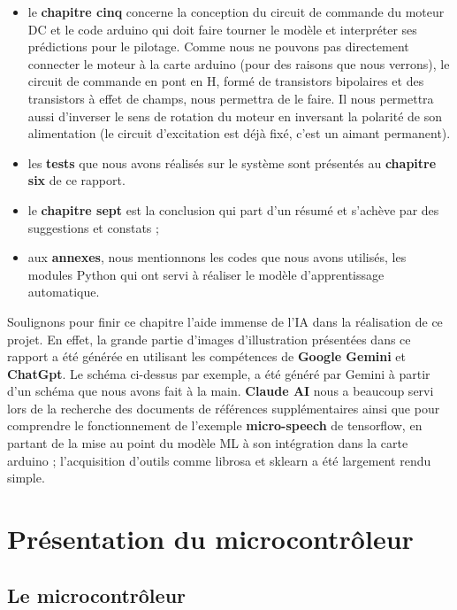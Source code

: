 \documentclass[a4paper,12pt,twoside]{report}
\theoremstyle{definition}
\theoremstyle{plain}
\theoremstyle{remark}
\begin{document}
\begin{itemize}
	\item le \textbf{chapitre cinq} concerne la conception du circuit de commande du moteur \ac{DC} et le code arduino qui doit faire tourner le modèle et interpréter ses prédictions pour le pilotage. Comme nous ne pouvons pas directement connecter le moteur à la carte arduino (pour des raisons que nous verrons), le circuit de commande en pont en H, formé de transistors bipolaires et des transistors à effet de champs, nous permettra de le faire. Il nous permettra aussi d'inverser le sens de rotation du moteur en inversant la polarité de son alimentation (le circuit d'excitation est déjà fixé, c'est un aimant permanent).
	
	\item les \textbf{tests} que nous avons réalisés sur le système sont présentés au \textbf{chapitre six} de ce rapport.
	
	\item le \textbf{chapitre sept} est la conclusion qui part d'un résumé et s'achève par des suggestions et constats ;
	\item aux \textbf{annexes}, nous mentionnons les codes que nous avons utilisés, les modules Python qui ont servi à réaliser le modèle d'apprentissage automatique.
\end{itemize}

Soulignons pour finir ce chapitre l'aide immense de l'\ac{IA} dans la réalisation de ce projet. En effet, la grande partie d'images d'illustration présentées dans ce rapport a été générée en utilisant les compétences de \textbf{Google Gemini} et \textbf{ChatGpt}. Le schéma ci-dessus par exemple, a été généré par Gemini à partir d'un schéma que nous avons fait à la main. \textbf{Claude AI} nous a beaucoup servi lors de la recherche des documents de références supplémentaires ainsi que pour comprendre le fonctionnement de l'exemple \textbf{micro-speech} de tensorflow, en partant de la mise au point du modèle \ac{ML} à son intégration dans la carte arduino ; l'acquisition d'outils comme librosa et sklearn a été largement rendu simple.

\chapter{Présentation du microcontrôleur}

\section{Le microcontrôleur}
\end{document}
